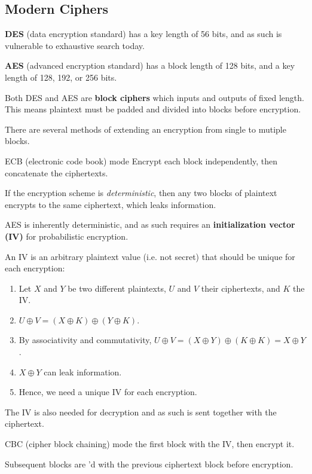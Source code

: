 \subsection{Modern Ciphers}
\textbf{DES} (data encryption standard) has a key length of 56 bits, and as such is vulnerable to exhaustive search today.

\textbf{AES} (advanced encryption standard) has a block length of 128 bits, and a key length of 128, 192, or 256 bits.

Both DES and AES are \textbf{block ciphers} which inputs and outputs of fixed length. This means plaintext must be padded and divided into blocks before encryption.

There are several methods of extending an encryption from single to mutiple blocks.

\begin{defn}{ECB (electronic code book) mode}
    Encrypt each block independently, then concatenate the ciphertexts.

    If the encryption scheme is \textit{deterministic}, then any two blocks of plaintext encrypts to the same ciphertext, which leaks information.
\end{defn}

AES is inherently deterministic, and as such requires an \textbf{initialization vector (IV)} for probabilistic encryption.

An IV is an arbitrary plaintext value (i.e. not secret) that should be unique for each encryption:

\begin{enumerate}
    \item Let $X$ and $Y$ be two different plaintexts, $U$ and $V$ their ciphertexts, and $K$ the IV.
    \item $U \oplus V = (X \oplus K) \oplus (Y \oplus K)$.
    \item By associativity and commutativity, $U \oplus V = (X \oplus Y) \oplus (K \oplus K) = X \oplus Y$.
    \item $X \oplus Y$ can leak information.
    \item Hence, we need a unique IV for each encryption.
\end{enumerate}

The IV is also needed for decryption and as such is sent together with the ciphertext.

\begin{defn}{CBC (cipher block chaining) mode}
     the first block with the IV, then encrypt it.

    Subsequent blocks are 'd with the previous ciphertext block before encryption.
\end{defn}

